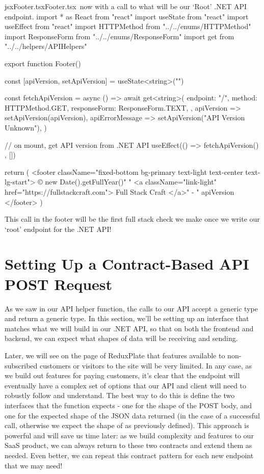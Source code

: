 \documentclass[a4paper,headinclude=on,footinclude=on,12pt,oneside]{scrbook}
\begin{document}
\begin{codeInput}{jsx}{Footer.tsx}{Footer.tsx\, now with a call to what will be our `Root' .NET API endpoint.}
import * as React from "react"
import { useState } from "react"
import { useEffect } from "react"
import HTTPMethod from "../../enums/HTTPMethod"
import ResponseForm from "../../enums/ResponseForm"
import { get } from "../../helpers/APIHelpers"

export function Footer() {
  const [apiVersion, setApiVersion] = useState<string>("")

  const fetchApiVersion = async () => {
    await get<string>(
      {
        endpoint: "/",
        method: HTTPMethod.GET,
        responseForm: ResponseForm.TEXT,
      },
      apiVersion => setApiVersion(apiVersion),
      apiErrorMessage => setApiVersion("API Version Unknown"),
    )
  }

  // on mount, get API version from .NET API
  useEffect(() => {
    fetchApiVersion()
  }, [])

  return (
    <footer className="fixed-bottom bg-primary text-light text-center text-lg-start">
      © {new Date().getFullYear()}{" "}
      <a className="link-light" href="https://fullstackcraft.com">
        Full Stack Craft
      </a>{" - "}
      {apiVersion}
    </footer>
  )
}  
\end{codeInput}

This call in the footer will be the first full stack check we make once we write our `root' endpoint for the .NET API!

\section{Setting Up a Contract-Based API POST Request}\label{contract-based-api}

As we saw in our  API helper function, the calls to our API accept a generic type and return a generic type. In this section, we'll be setting up an interface that matches what we will build in our .NET API, so that on both the frontend and backend, we can expect what shapes of data will be receiving and sending. 

Later, we will see on the  page of ReduxPlate that features available to non-subscribed customers or visitors to the site will be very limited. In any case, as we build out features for paying customers, it's clear that the  endpoint will eventually have a complex set of options that our API and client will need to robustly follow and understand. The best way to do this is define the two interfaces that the  function expects - one for the shape of the POST body, and one for the expected shape of the JSON data returned (in the case of a successful call, otherwise we expect the shape of  as previously defined). This approach is powerful and will save us time later: as we build complexity and features to our SaaS product, we can always return to these two contracts and extend them as needed. Even better, we can repeat this contract pattern for each new endpoint that we may need!
\end{document}

